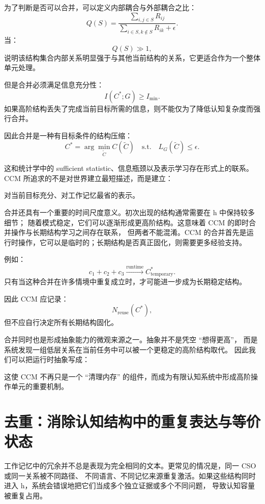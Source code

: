 为了判断是否可以合并，可以定义内部耦合与外部耦合之比：
\[
Q(S)
=
\frac{
\sum_{i,j\in S}R_{ij}
}{
\sum_{i\in S,k\notin S}R_{ik}+\epsilon
}.
\]
当：
\[
Q(S)\gg1,
\]
说明该结构集合内部关系明显强于与其他当前结构的关系，它更适合作为一个整体单元处理。

但是合并必须满足信息充分性：
\[
I(C^*;G)
\ge
I_{\min}.
\]
如果高阶结构丢失了完成当前目标所需的信息，则不能仅为了降低认知复杂度而强行合并。

因此合并是一种有目标条件的结构压缩：
\[
\boxed{
C^*
=
\arg\min_{\widetilde C}
C(\widetilde C)
\quad
\mathrm{s.t.}
\quad
L_G(\widetilde C)\le\epsilon.
}
\]

这和统计学中的 sufficient statistic、信息瓶颈以及表示学习存在形式上的联系。
CCM 所追求的不是对世界建立最短描述，而是建立：
\begin{statementbox}
对当前目标充分、对工作记忆最省的表示。
\end{statementbox}

合并还具有一个重要的时间尺度意义。初次出现的结构通常需要在 h 中保持较多细节；
随着模式稳定，它们可以逐渐形成更高阶结构。这意味着 CCM 的即时合并操作与长期结构学习之间存在联系，
但两者不能混淆。CCM 的合并首先是运行时操作，它可以是临时的；长期结构是否真正固化，则需要更多经验支持。

例如：
\[
c_1+c_2+c_3
\overset{\mathrm{runtime}}{\longrightarrow}
C^*_{\mathrm{temporary}}.
\]
只有当这种合并在许多情境中重复成立时，才可能进一步成为长期稳定结构。

因此 CCM 应记录：
\[
N_{\mathrm{reuse}}(C^*),
\]
但不应自行决定所有长期结构固化。

合并同时也是形成抽象能力的微观来源之一。抽象并不是凭空 ``想得更高''，
而是系统发现一组低层关系在当前任务中可以被一个更稳定的高阶结构取代。
因此我们可以把运行时抽象写成：
\begin{statementbox}
\centering
{}
\end{statementbox}

这使 CCM 不再只是一个 ``清理内存'' 的组件，而成为有限认知系统中形成高阶操作单元的重要机制。


\section{去重：消除认知结构中的重复表达与等价状态}

工作记忆中的冗余并不总是表现为完全相同的文本。更常见的情况是，同一 CSO 或同一关系被不同路径、
不同语言、不同记忆来源重复激活。如果这些结构同时进入 h，系统会错误地把它们当成多个独立证据或多个不同问题，
导致认知容量被重复占用。

